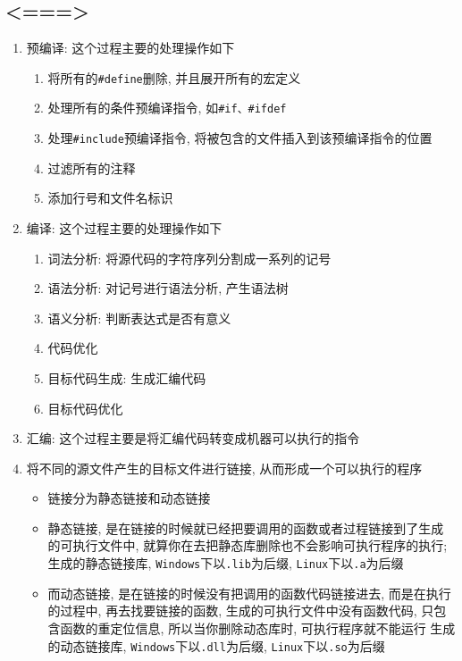 \subsection{<===>}
\begin{enumerate}
	\item 预编译: 这个过程主要的处理操作如下
	\begin{enumerate}
		\item 将所有的{\tt \#define}删除, 并且展开所有的宏定义
		\item 处理所有的条件预编译指令, 如{\tt \#if、\#ifdef}
		\item 处理{\tt \#include}预编译指令, 将被包含的文件插入到该预编译指令的位置
		\item 过滤所有的注释
		\item 添加行号和文件名标识
	\end{enumerate}
	\item 编译: 这个过程主要的处理操作如下
	\begin{enumerate}
		\item 词法分析: 将源代码的字符序列分割成一系列的记号
		\item 语法分析: 对记号进行语法分析, 产生语法树
		\item 语义分析: 判断表达式是否有意义
		\item 代码优化
		\item 目标代码生成: 生成汇编代码
		\item 目标代码优化
	\end{enumerate}
	\item 汇编: 这个过程主要是将汇编代码转变成机器可以执行的指令
	\item 将不同的源文件产生的目标文件进行链接, 从而形成一个可以执行的程序
	\begin{itemize}
		\item 链接分为静态链接和动态链接
		\item 静态链接, 是在链接的时候就已经把要调用的函数或者过程链接到了生成的可执行文件中, 
				就算你在去把静态库删除也不会影响可执行程序的执行; 生成的静态链接库, {\tt Windows}下以{\tt .lib}为后缀, 
				{\tt Linux}下以{\tt .a}为后缀
		\item 而动态链接, 是在链接的时候没有把调用的函数代码链接进去, 而是在执行的过程中, 再去找要链接的函数, 
				生成的可执行文件中没有函数代码, 只包含函数的重定位信息, 所以当你删除动态库时, 可执行程序就不能运行
				生成的动态链接库, {\tt Windows}下以{\tt .dll}为后缀, {\tt Linux}下以{\tt .so}为后缀
	\end{itemize}
\end{enumerate}
